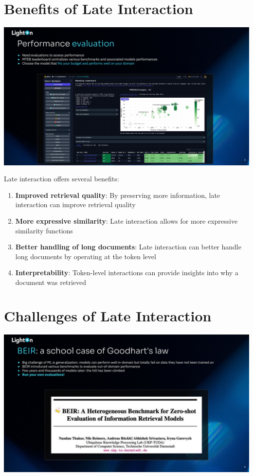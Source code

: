 \documentclass[
  letterpaper,
  oneside]{scrbook}
\providecommand{\tightlist}{%
  \setlength{\itemsep}{0pt}\setlength{\parskip}{0pt}}\usepackage{longtable,booktabs,array}
\begin{document}
\section{Benefits of Late
Interaction}\label{benefits-of-late-interaction}

\includegraphics{chapters/../p4-images/slide_5.png}

Late interaction offers several benefits:

\begin{enumerate}
\def\labelenumi{\arabic{enumi}.}
\tightlist
\item
  \textbf{Improved retrieval quality}: By preserving more information,
  late interaction can improve retrieval quality
\item
  \textbf{More expressive similarity}: Late interaction allows for more
  expressive similarity functions
\item
  \textbf{Better handling of long documents}: Late interaction can
  better handle long documents by operating at the token level
\item
  \textbf{Interpretability}: Token-level interactions can provide
  insights into why a document was retrieved
\end{enumerate}

\section{Challenges of Late
Interaction}\label{challenges-of-late-interaction}

\includegraphics{chapters/../p4-images/slide_6.png}
\end{document}
